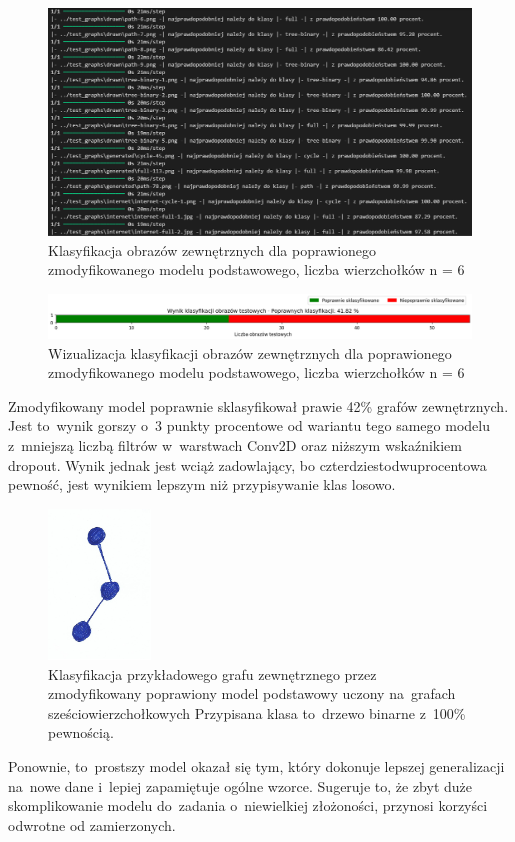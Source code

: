 \begin{figure}[ht]
	\centering
	\includegraphics[width=15.5cm]{resources/tests/images/v4/base6_1_1_txt.png}
	\caption{Klasyfikacja obrazów zewnętrznych dla poprawionego zmodyfikowanego modelu podstawowego, liczba wierzchołków n = 6}
	\label{Fig:tests-best-2b}
\end{figure}
\FloatBarrier

\begin{figure}[ht]
	\centering
	\includegraphics[width=15.5cm]{resources/tests/images/v4/base6_1_1_bar.png}
	\caption{Wizualizacja klasyfikacji obrazów zewnętrznych dla poprawionego zmodyfikowanego modelu podstawowego, liczba wierzchołków n = 6}
	\label{Fig:tests-best-1c}
\end{figure}
\FloatBarrier

Zmodyfikowany model poprawnie sklasyfikował prawie 42\% grafów zewnętrznych.
Jest to~wynik gorszy o~3 punkty procentowe od wariantu tego samego modelu
z~mniejszą liczbą filtrów w~warstwach Conv2D oraz niższym wskaźnikiem dropout.
Wynik jednak jest wciąż zadowlający, bo czterdziestodwuprocentowa pewność,
jest wynikiem lepszym niż przypisywanie klas losowo.

\begin{figure}[ht]
	\centering
	\includegraphics[height=4cm]{../graph_classification/test_graphs/drawn/path-4.png}
	\caption{Klasyfikacja przykładowego grafu zewnętrznego przez zmodyfikowany poprawiony model podstawowy
		uczony na~grafach sześciowierzchołkowych
		Przypisana klasa to~drzewo binarne z~100\% pewnością.}
	\label{Fig:tests-best-1d}
\end{figure}
\FloatBarrier

Ponownie, to~prostszy model okazał się tym, który dokonuje lepszej generalizacji na~nowe dane
i~lepiej zapamiętuje ogólne wzorce.
Sugeruje to, że zbyt duże skomplikowanie modelu do~zadania o~niewielkiej złożoności,
przynosi korzyści odwrotne od zamierzonych.